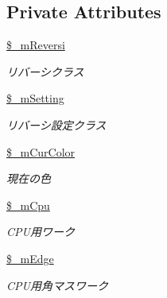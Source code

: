 \subsection*{Private Attributes}
\begin{DoxyCompactItemize}
\item 
\mbox{\label{class_reversi_play_ab6b142a6d453a963b8c8c9f6829f080a}} 
\hyperlink{class_reversi_play_ab6b142a6d453a963b8c8c9f6829f080a}{\$\+\_\+m\+Reversi}
\begin{DoxyCompactList}\small\item\em リバーシクラス \end{DoxyCompactList}\item 
\mbox{\label{class_reversi_play_a8afaea234500f7e7c8b82ae7074e3453}} 
\hyperlink{class_reversi_play_a8afaea234500f7e7c8b82ae7074e3453}{\$\+\_\+m\+Setting}
\begin{DoxyCompactList}\small\item\em リバーシ設定クラス \end{DoxyCompactList}\item 
\mbox{\label{class_reversi_play_addd9335d56d0d7f94c96c0d0243517fa}} 
\hyperlink{class_reversi_play_addd9335d56d0d7f94c96c0d0243517fa}{\$\+\_\+m\+Cur\+Color}
\begin{DoxyCompactList}\small\item\em 現在の色 \end{DoxyCompactList}\item 
\mbox{\label{class_reversi_play_a1eaf7e09a3c1797e3a5aa7ffe2fc144f}} 
\hyperlink{class_reversi_play_a1eaf7e09a3c1797e3a5aa7ffe2fc144f}{\$\+\_\+m\+Cpu}
\begin{DoxyCompactList}\small\item\em C\+P\+U用ワーク \end{DoxyCompactList}\item 
\mbox{\label{class_reversi_play_ac73d4aea2bec94a73d6096645f3c05f3}} 
\hyperlink{class_reversi_play_ac73d4aea2bec94a73d6096645f3c05f3}{\$\+\_\+m\+Edge}
\begin{DoxyCompactList}\small\item\em C\+P\+U用角マスワーク \end{DoxyCompactList}\item 

\end{DoxyCompactItemize}
